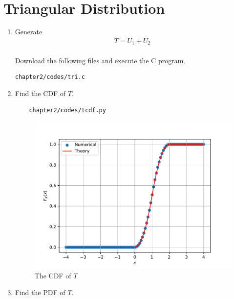 \section{Triangular Distribution}
%
\begin{enumerate}
\item Generate 
	\begin{align}
		T = U_1+U_2
	\end{align}\\
\solution Download the following files and execute the  C program.
\begin{lstlisting}
chapter2/codes/tri.c
\end{lstlisting}
\item Find the CDF of $T$.\\
\solution 
\begin{lstlisting}
	chapter2/codes/tcdf.py
\end{lstlisting}
\begin{figure}[H]
\centering
\includegraphics[width=\columnwidth]{chapter2/figs/triangle_cdf.pdf}
\caption{The CDF of $T$}
\label{fig:tri_cdf}
\end{figure}
\item Find the PDF of $T$.\\


\end{enumerate}
